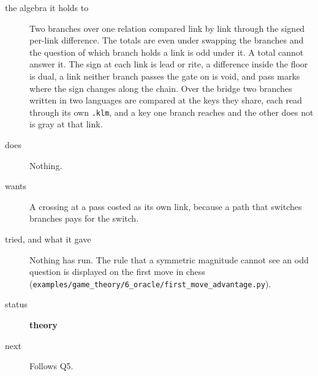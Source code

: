 \begin{description}
\item[{the algebra it holds to}] Two branches over one relation compared link by link through the signed per-link difference. The totals are even under swapping the branches and the question of which branch holds a link is odd under it. A total cannot answer it. The sign at each link is lead or rite, a difference inside the floor is dual, a link neither branch passes the gate on is void, and pass marks where the sign changes along the chain. Over the bridge two branches written in two languages are compared at the keys they share, each read through its own \texttt{.\allowbreak{}klm}, and a key one branch reaches and the other does not is gray at that link.
\item[{does}] Nothing.
\item[{wants}] A crossing at a pass costed as its own link, because a path that switches branches pays for the switch.
\item[{tried, and what it gave}] Nothing has run. The rule that a symmetric magnitude cannot see an odd question is displayed on the first move in chess (\texttt{examples/\allowbreak{}game\_\allowbreak{}theory/\allowbreak{}6\_\allowbreak{}oracle/\allowbreak{}first\_\allowbreak{}move\_\allowbreak{}advantage.\allowbreak{}py}).
\item[{status}] \textbf{theory}
\item[{next}] Follows Q5.
\end{description}

